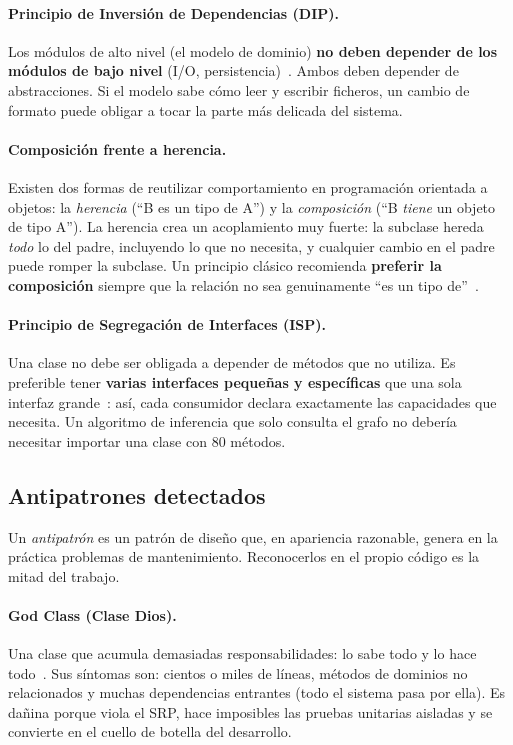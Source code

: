 \documentclass[11pt,a4paper]{article}
\begin{document}
\paragraph{Principio de Inversión de Dependencias (DIP).}
\label{sec:dip}
Los módulos de alto nivel (el modelo de dominio) \textbf{no deben depender
de los módulos de bajo nivel} (I/O, persistencia)~\cite{martin2003}.
Ambos deben depender de abstracciones.  Si el modelo sabe cómo leer y
escribir ficheros, un cambio de formato puede obligar a tocar la parte
más delicada del sistema.

\paragraph{Composición frente a herencia.}
\label{sec:composicion}
Existen dos formas de reutilizar comportamiento en programación orientada
a objetos: la \emph{herencia} (``B es un tipo de A'') y la
\emph{composición} (``B \emph{tiene} un objeto de tipo A'').  La herencia
crea un acoplamiento muy fuerte: la subclase hereda \emph{todo} lo del
padre, incluyendo lo que no necesita, y cualquier cambio en el padre puede
romper la subclase.  Un principio clásico recomienda \textbf{preferir la
composición} siempre que la relación no sea genuinamente ``es un tipo
de''~\cite{gamma1995}.

\paragraph{Principio de Segregación de Interfaces (ISP).}
\label{sec:isp}
Una clase no debe ser obligada a depender de métodos que no utiliza.  Es
preferible tener \textbf{varias interfaces pequeñas y específicas} que una
sola interfaz grande~\cite{martin2003}: así, cada consumidor declara
exactamente las capacidades que necesita.  Un algoritmo de inferencia que
solo consulta el grafo no debería necesitar importar una clase con 80
métodos.

\subsection{Antipatrones detectados}
\label{sec:antipatrones}

Un \emph{antipatrón} es un patrón de diseño que, en apariencia razonable,
genera en la práctica problemas de mantenimiento.  Reconocerlos en el
propio código es la mitad del trabajo.

\paragraph{God Class (Clase Dios).}
Una clase que acumula demasiadas responsabilidades: lo sabe todo y lo hace
todo~\cite{fowler2019}.  Sus síntomas son: cientos o miles de líneas,
métodos de dominios no relacionados y muchas dependencias entrantes (todo
el sistema pasa por ella).  Es dañina porque viola el SRP, hace imposibles
las pruebas unitarias aisladas y se convierte en el cuello de botella del
desarrollo.
\end{document}
